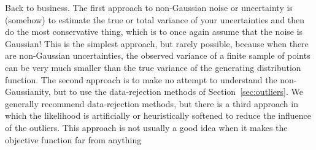 \documentclass[12pt,twoside,pdftex]{article}
\newcommand{\sectionname}{Section}
\begin{document}
Back to business.  The first approach to non-Gaussian noise or
uncertainty is (somehow) to estimate the true or total variance of
your uncertainties and then do the most conservative thing, which is
to once again assume that the noise is Gaussian!  This is the simplest
approach, but rarely possible, because when there are non-Gaussian
uncertainties, the observed variance of a finite sample of points can
be very much smaller than the true variance of the generating
distribution function.  The second approach is to make no attempt to
understand the non-Gaussianity, but to use the data-rejection methods
of \sectionname~\ref{sec:outliers}.  We generally recommend
data-rejection methods, but there is a third approach in which the
likelihood is artificially or heuristically softened to reduce the
influence of the outliers.  This approach is not usually a good idea
when it makes the objective function far from anything
\end{document}
